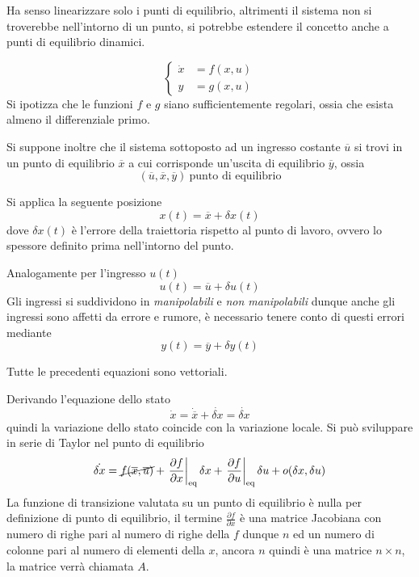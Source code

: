 Ha senso linearizzare solo i punti di equilibrio, altrimenti il sistema non si
troverebbe nell'intorno di un punto, si potrebbe estendere il concetto anche a
punti di equilibrio dinamici.

$$\left\{
\begin{aligned}
\dot{x} &= f(x,u) \\
y &= g(x,u)
\end{aligned}\right.$$
Si ipotizza che le funzioni $f$ e $g$ siano sufficientemente regolari, ossia
che esista almeno il differenziale primo.

Si suppone inoltre che il sistema sottoposto ad un ingresso costante
$\overline{u}$ si trovi in un punto di equilibrio $\overline{x}$ a cui
corrisponde un'uscita di equilibrio $\overline{y}$, ossia
$$
(\overline{u},\overline{x},\overline{y}) \ \text{punto di equilibrio}
$$

Si applica la seguente posizione
$$
x(t) = \overline{x} + \delta x(t)
$$
dove $\delta x(t)$ è l'errore della traiettoria rispetto al punto di lavoro,
ovvero lo spessore definito prima nell'intorno del punto.

Analogamente per l'ingresso $u(t)$
$$
u(t) = \overline{u} + \delta u(t)
$$
Gli ingressi si suddividono in \textit{manipolabili} e \textit{non
manipolabili} dunque
anche gli ingressi sono affetti da errore e rumore,  è necessario tenere conto
di questi errori mediante
$$
y(t) = \overline{y}+\delta y(t)
$$

Tutte le precedenti equazioni sono vettoriali.

Derivando l'equazione dello stato
$$
\dot{x} = \dot{\overline{x}} + \dot{\delta x} = \dot{\delta x}
$$
quindi la variazione dello stato coincide con la variazione locale. Si può
sviluppare in serie di Taylor nel punto di equilibrio
\begin{equation}
\dot{\delta x} = \cancel{f(\overline{x},\overline{u})} + \left.\frac{\partial
f}{\partial x}\right|_{\text{eq}}\delta x + \left.\frac{\partial f}{\partial
u}\right|_{\text{eq}}\delta u + o(\delta x, \delta u)
\label{eq.:linearizzazione_sistema}
\end{equation}
La funzione di transizione valutata su un punto di equilibrio è nulla per
definizione di punto di equilibrio, il termine $\frac{\partial f}{\partial x}$
è una matrice Jacobiana con numero di righe pari al numero di righe della $f$
dunque $n$ ed un numero di colonne pari al numero di elementi della $x$, ancora
$n$ quindi è una matrice $n\times n$, la matrice verrà chiamata $A$.

